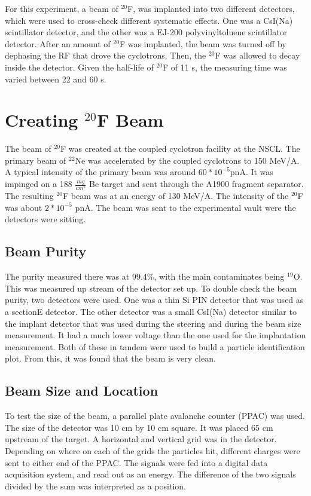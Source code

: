 \documentclass[main.tex]{subfiles}
\begin{document}
For this experiment, a  beam of  $^{20}$F, was implanted into two different detectors, which were used to cross-check different systematic effects.
One was a CsI(Na) scintillator detector, and the other was a  EJ-200 polyvinyltoluene scintillator detector. 
After an amount of $^{20}$F was implanted, the beam was turned off by dephasing the RF that drove the cyclotrons.
Then, the $^{20}$F was allowed to decay inside the detector. 
Given the half-life of $^{20}$F of 11 s, the measuring time was varied between 22 and 60 s.

\section{Creating $^{20}$F Beam}

The beam of $^{20}$F was created at the coupled cyclotron facility at the NSCL.
The primary beam of $^{22}$Ne was accelerated by the coupled cyclotrons to 150 MeV/A. 
A typical intensity of the primary beam was around $60 * 10^{-5}$pnA.
It was impinged on a 188 $\frac{mg}{cm^{2}}$ Be target and sent through the A1900 fragment separator. 
The resulting $^{20}$F beam was at an energy of 130 MeV/A. 
The intensity of the $^{20}$F was about $2 * 10^{-5}$ pnA.
The beam was sent to the experimental vault were the detectors were sitting.
\subsection{Beam Purity}

The purity measured there was at 99.4\%, with the main contaminates being  $^{19}$O. 
This was measured up stream of the detector set up.
To double check the beam purity, two detectors were used. 
One was a thin Si PIN detector that was used as a sectionE detector. 
The other detector was a small CsI(Na) detector similar to the implant detector that was used during the steering and during the beam size measurement. 
It had a much lower voltage than the one used for the implantation measurement. 
Both of these in tandem were used to build a particle identification plot.
From this, it was found that the beam is very clean.

\subsection{Beam Size and Location}
To test the size of the beam, a parallel plate avalanche counter (PPAC) was used.
The size of the detector was 10 cm by 10 cm square. 
It was placed 65 cm upstream of the target.
A horizontal and vertical grid was in the detector.
Depending on where on each of the grids the particles hit, different charges were sent to either end of the PPAC.
The signals were fed into a digital data acquisition system, and read out as an energy.
The difference of the two signals divided by the sum was interpreted as a position.
\end{document}

